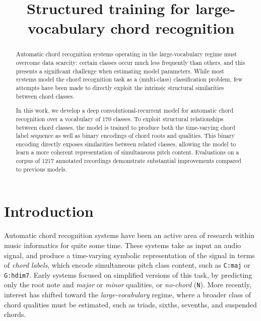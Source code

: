 \documentclass{article}
\title{Structured training for large-vocabulary chord recognition}
\begin{document}
%
\maketitle
%
\begin{abstract}
Automatic chord recognition systems operating in the large-vocabulary regime must overcome data scarcity: certain classes occur much less frequently than others, and this presents a significant challenge when estimating model parameters.
While most systems model the chord recognition task as a (multi-class) classification problem, few attempts have been made to directly exploit the intrinsic structural similarities between chord classes.

In this work, we develop a deep convolutional-recurrent model for automatic chord recognition over a vocabulary of 170 classes.
To exploit structural relationships between chord classes, the model is trained to produce both the time-varying chord label sequence as well as binary encodings of chord roots and qualities.
This binary encoding directly exposes similarities between related classes, allowing the model to learn a more coherent representation of simultaneous pitch content.
Evaluations on a corpus of 1217 annotated recordings demonstrate substantial improvements compared to previous models.
\end{abstract}
%
\section{Introduction}\label{sec:introduction}




Automatic chord recognition systems have been an active area of research within music informatics for quite some time.
These systems take as input an audio signal, and produce a time-varying symbolic representation of the signal in terms of \emph{chord labels}, which encode simultaneous pitch class content, such as \texttt{C:maj} or \texttt{G:hdim7}.
Early systems focused on simplified versions of this task, by predicting only the root note and \emph{major} or \emph{minor} qualities, or \emph{no-chord} (\texttt{N}).
More recently, interest has shifted toward the \emph{large-vocabulary} regime, where a broader class of chord qualities must be estimated, such as triads, sixths, sevenths, and suspended chords.
\end{document}
